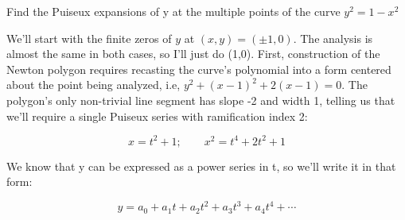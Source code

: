
%
%
%
%
%
%
%

\example Find the Puiseux expansions of y at the multiple points of the
curve $y^2 = 1 - x^2$

We'll start with the finite zeros of $y$ at $(x,y)=(, 0)$.  The
analysis is almost the same in both cases, so I'll just do (1,0).
First, construction of the Newton polygon requires recasting the
curve's polynomial into a form centered about the point being
analyzed, i.e, $y^2 + (x-1)^2 + 2(x-1) = 0$.  The polygon's only
non-trivial line segment has slope -2 and width 1, telling us that
we'll require a single Puiseux series with ramification index 2:

$$x=t^2+1; \qquad x^2=t^4+2t^2+1$$

We know that y can be expressed as a power series in t, so we'll write
it in that form:

$$y=a_0 + a_1 t + a_2 t^2 + a_3 t^3 + a_4 t^4 + \cdots$$


